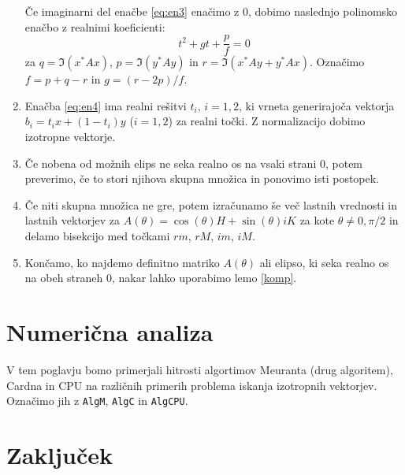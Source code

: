 \documentclass[12pt,a4paper]{amsart}
\theoremstyle{definition}
\theoremstyle{plain}
\begin{document}
\begin{enumerate}[1.]
Če imaginarni del enačbe \eqref{eq:en3} enačimo z 0, dobimo naslednjo polinomsko enačbo z realnimi koeficienti:
\begin{equation}
t^2+gt+\frac{p}{f}=0 \label{eq:en4}
\end{equation}
za $q=\Im(x^\ast Ax)$, $p=\Im(y^\ast Ay)$ in $r=\Im(x^\ast  Ay + y^\ast Ax)$. Označimo $f=p+q-r$ in $g=(r-2p)/f$.
\item  Enačba \eqref{eq:en4} ima realni rešitvi $t_i$, $i=1,2$, ki vrneta generirajoča vektorja $b_i=t_ix+(1-t_i)y$ ($i=1,2$) za realni točki. Z normalizacijo dobimo izotropne vektorje. %
\item Če nobena od možnih elips ne seka realno os na vsaki strani 0, potem preverimo, če to stori njihova skupna množica in ponovimo isti postopek.
\item Če niti skupna množica ne gre, potem izračunamo še več lastnih vrednosti in lastnih vektorjev za $A(\theta)=\cos(\theta)H+\sin(\theta)iK$ za kote $\theta \not =0,\pi/2$ in delamo bisekcijo med točkami $rm$, $rM$, $im$, $iM$.
\item Končamo, ko najdemo definitno matriko $A(\theta)$ ali elipso, ki seka realno os na obeh straneh 0, nakar lahko uporabimo lemo \ref{komp}.
\end{enumerate}
\section{Numerična analiza}
V tem poglavju bomo primerjali hitrosti algortimov Meuranta (drug algoritem), Cardna in CPU na različnih primerih problema iskanja izotropnih vektorjev. O\-zna\-či\-mo jih z \verb+AlgM+, \verb+AlgC+ in \verb+AlgCPU+. 
\section{Zaključek}



\vfill
\end{document}

